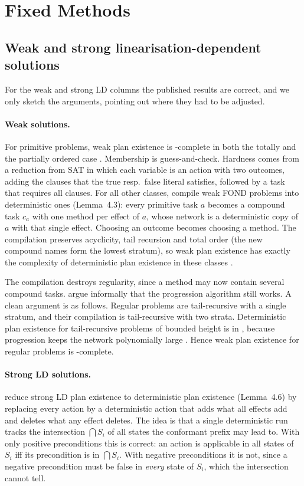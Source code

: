 \section{Fixed Methods}\label{sec:fixed}

\subsection{Weak and strong linearisation-dependent solutions}

For the weak and strong LD columns the published results are correct, and we only sketch the
arguments, pointing out where they had to be adjusted.

\paragraph{Weak solutions.}
For primitive problems, weak plan existence is \NP-complete in both the totally and the
partially ordered case \parencite[Thm.~4.1, Cor.~4.2]{chen:bercher:icaps-21}. Membership is
guess-and-check. Hardness comes from a reduction from SAT in which each variable is an action with
two outcomes, adding the clauses that the true resp.\ false literal satisfies, followed by a task
that requires all clauses. For all other classes, \CBa{} compile weak FOND problems into
deterministic ones (Lemma~4.3): every primitive task $a$ becomes a compound task $c_a$ with one
method per effect of $a$, whose network is a deterministic copy of $a$ with that single effect.
Choosing an outcome becomes choosing a method. The compilation preserves acyclicity, tail recursion
and total order (the new compound names form the lowest stratum), so weak plan existence has
exactly the complexity of deterministic plan existence in these classes
\parencite{erol:et:al:amai-96,alford:et:al:icaps-15}.

The compilation destroys regularity, since a method may now contain several compound tasks.
\CBa{} argue informally that the progression algorithm still works. A clean argument is
as follows. Regular problems are tail-recursive with a single stratum, and their compilation is
tail-recursive with two strata. Deterministic plan existence for tail-recursive problems of bounded
height is in \PSPACE, because progression keeps the network polynomially large
\parencite{alford:et:al:icaps-15}. Hence weak plan existence for regular problems is \PSPACE-complete.

\paragraph{Strong LD solutions.}
\CBa{} reduce strong LD plan existence to deterministic plan existence (Lemma~4.6) by replacing
every action by a deterministic action that adds what all effects add and deletes what any effect
deletes. The idea is that a single deterministic run tracks the intersection $\bigcap S_i$ of all
states the conformant prefix may lead to. With only positive preconditions this is correct: an
action is applicable in all states of $S_i$ iff its precondition is in $\bigcap S_i$. With
negative preconditions it is not, since a negative precondition must be false in \emph{every}
state of $S_i$, which the intersection cannot tell.

